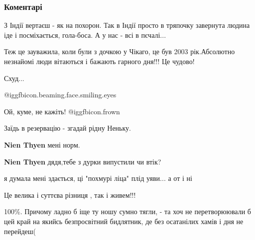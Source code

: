  
 
 
 
 
\subsubsection{Коментарі}
\label{sec:21_10_2021.fb.gorovyj_ruslan.1.amerika_ulibki.cmt}

\begin{itemize} %
З Індії вертаєш - як на похорон. Так в Індії просто в тряпочку завернута людина іде і посміхається, гола-боса. А у нас - всі в пєчалі...

Теж це зауважила, коли були з дочкою у Чікаго, це був 2003 рік.Абсолютно незнайомі люди вітаються і бажають гарного дня!!! Це чудово!

Схуд...


 @igg{fbicon.beaming.face.smiling.eyes} 

Ой, куме, не кажіть!  @igg{fbicon.frown} 


Заїдь в резервацію - згадай рідну Неньку.

\begin{itemize} %

\textbf{Nien Thyen} мені норм.

\textbf{Nien Thyen} дядя,тебе з дурки випустили чи втік?
\end{itemize} %

я думала мені здається, ці "похмурі ліца" плід уяви... а от і ні

Це велика і суттєва різниця , так і живем!!!


100\%. Причому ладно б іще ту ношу сумно тягли, - та хоч не перетворюювали б цей
край на якийсь безпросвітний бидлятник, де без осатанілих хамів і дня не
перейдеш(



\end{itemize}
